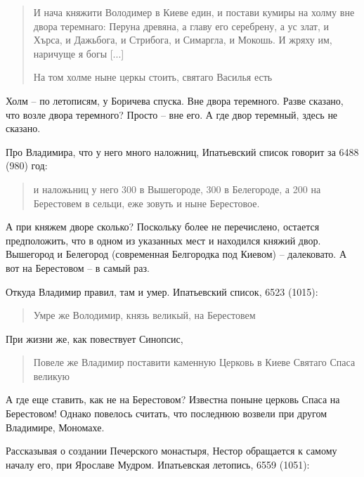 \documentclass[a5paper,11pt,openany]{article}
\begin{document}
\begin{quotation}
\noindent И нача княжити Володимер в Киеве един, и постави кумиры на холму вне двора теремнаго: Перуна древяна, а главу его серебрену, а ус злат, и Хърса, и Дажьбога, и Стрибога, и Симаргла, и Мокошь. И жряху им, наричуще я богы [...]

На том холме ныне церкы стоить, святаго Василья есть
\end{quotation}

Холм – по летописям, у Боричева спуска. Вне двора теремного. Разве сказано, что возле двора теремного? Просто – вне его. А где двор теремный, здесь не сказано.



Про Владимира, что у него много наложниц, Ипатьевский список говорит за 6488 (980) год:

\begin{quotation}
\noindent и наложьниц у него 300 в Вышегороде, 300 в Белегороде, а 200 на Берестовем в сельци, еже зовуть и ныне Берестовое.
\end{quotation}

А при княжем дворе сколько? Поскольку более не перечислено, остается предположить, что в одном из указанных мест и находился княжий двор. Вышегород и Белегород (современная Белгородка под Киевом) – далековато. А вот на Берестовом – в самый раз.

Откуда Владимир правил, там и умер. Ипатьевский список, 6523 (1015):

\begin{quotation}
\noindent Умре же Володимир, князь великый, на Берестовем
\end{quotation}

При жизни же, как повествует Синопсис,

\begin{quotation}
\noindent Повеле же Владимир поставити каменную Церковь в Киеве Святаго Спаса великую
\end{quotation}

А где еще ставить, как не на Берестовом? Известна поныне церковь Спаса на Берестовом! Однако повелось считать, что последнюю возвели при другом Владимире, Мономахе.

Рассказывая о создании Печерского монастыря, Нес\-тор обращается к самому началу его, при Ярославе Мудром. Ипатьевская летопись, 6559 (1051):
\end{document}
